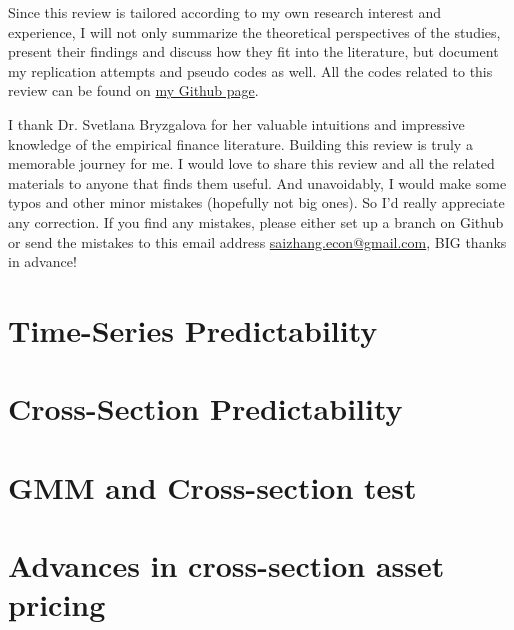 \documentclass[12pt,openany]{report}
\begin{document}
Since this review is tailored according to my own research interest and
experience, I will not only summarize the theoretical perspectives of the
studies, present their findings and discuss how they fit into the literature,
but document my replication attempts and pseudo codes as well. All the codes related
to this review can be found on \href{https://github.com/SaiChrisZHANG}{my Github page}.

I thank Dr. Svetlana Bryzgalova for her valuable intuitions and impressive
knowledge of the empirical finance literature. Building this review is truly
a memorable journey for me. I would love to share this review and all the related
materials to anyone that finds them useful. And unavoidably, I would make some
typos and other minor mistakes (hopefully not big ones). So I'd really appreciate
any correction. If you find any mistakes, please either set up a branch on Github
or send the mistakes to this email address 
\href{mailto:saizhang.econ@gmail.com}{saizhang.econ@gmail.com}, BIG thanks in advance!

\newpage

\dominitoc
{}%
\label{ToC-first-page}
\tableofcontents


\pagestyle{mystyle}
\chapter{Time-Series Predictability}


\chapter{Cross-Section Predictability}


\chapter{GMM and Cross-section test}


\chapter{Advances in cross-section asset pricing}

\newpage


\end{document}
